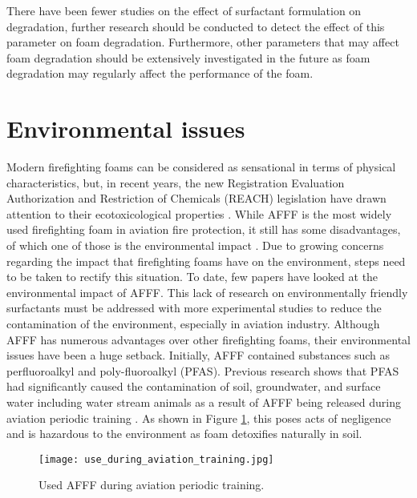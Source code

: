 There have been fewer studies on the effect of surfactant formulation on degradation, further research should be conducted to detect the effect of this parameter on foam degradation. Furthermore, other parameters that may affect foam degradation should be extensively investigated in the future as foam degradation may regularly affect the performance of the foam.

\section{Environmental issues}
Modern firefighting foams can be considered as sensational in terms of physical characteristics, but, in recent years, the new Registration Evaluation Authorization and Restriction of Chemicals (REACH) legislation have drawn attention to their ecotoxicological properties \cite{turekova2011environmental}. While AFFF is the most widely used firefighting foam in aviation fire protection, it still has some disadvantages, of which one of those is the environmental impact \cite{zhao2016improving}. Due to growing concerns regarding the impact that firefighting foams have on the environment, steps need to be taken to rectify this situation. To date, few papers have looked at the environmental impact of AFFF. This lack of research on environmentally friendly surfactants must be addressed with more experimental studies to reduce the contamination of the environment, especially in aviation industry.
Although AFFF has numerous advantages over other firefighting foams, their environmental issues have been a huge setback. Initially, AFFF contained substances such as perfluoroalkyl and poly-fluoroalkyl (PFAS). Previous research shows that PFAS had significantly caused the contamination of soil, groundwater, and surface water including water stream animals as a result of AFFF being released during aviation periodic training \cite{milley2018estimating}. As shown in Figure \ref{ch2:figure:use}, this poses acts of negligence and is hazardous to the environment as foam detoxifies naturally in soil.

\begin{figure}[H]
    \centering
    \texttt{[image: use\_during\_aviation\_training.jpg]}
    \caption{Used AFFF during aviation periodic training.}
    \label{ch2:figure:use}
\end{figure}

